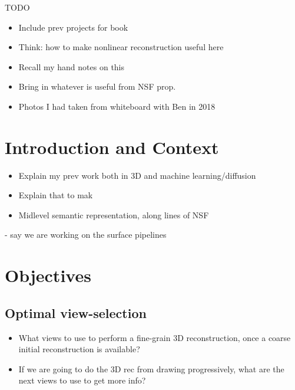 \documentclass[a4paper,titlepage]{article}
\begin{document}


%



TODO
\begin{itemize}
\item Include prev projects for book
\item Think: how to make nonlinear reconstruction useful here
\item Recall my hand notes on this
\item Bring in whatever is useful from NSF prop.
\item Photos I had taken from whiteboard with Ben in 2018
\end{itemize}

\section{Introduction and Context}

\begin{itemize}
\item Explain my prev work both in 3D and machine learning/diffusion
\item Explain that to mak
\item Midlevel semantic representation, along lines of NSF
\end{itemize}

\begin{draft}
   - say we are working on the surface pipelines
\end{draft}


\section{Objectives}

\subsection{Optimal view-selection}
\begin{itemize}
\item What views to use to perform a fine-grain 3D reconstruction, once a
  coarse initial reconstruction is available?
\item If we are going to do the 3D rec from drawing progressively, what are the
  next views to use to get more info?
\end{itemize}
\end{document}
